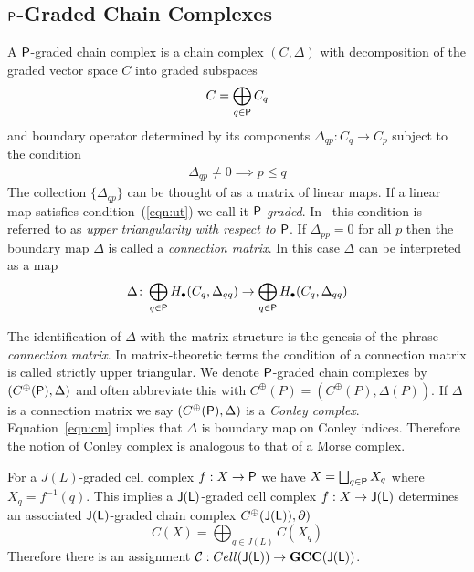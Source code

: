 %
%


\subsection{${\mathsf P}$-Graded Chain Complexes}\label{sec:grad:chain}


A ${\mathsf P}$-graded chain complex is a chain complex $(C,\Delta)$ with decomposition of the graded vector space $C$ into graded subspaces $$C=\bigoplus_{q\in {\mathsf P}} C_q$$ and boundary operator determined by its components $\Delta_{qp}:C_q\to C_p$ subject to the condition 
\begin{align}\label{eqn:ut}
\Delta_{qp}\neq 0\implies p\leq q
\end{align}  The collection $\{\Delta_{qp}\}$ can be thought of as a matrix of linear maps. If a linear map satisfies condition~(\ref{eqn:ut}) we call it {\em ${\mathsf P}$-graded}.  In~\cite{fran} this condition is referred to as {\em upper triangularity with respect to ${\mathsf P}$}.   If $\Delta_{pp} = 0$ for all $p$ then the boundary map $\Delta$ is called a {\em connection matrix}.  In this case $\Delta$ can be interpreted as a map
\begin{align}\label{eqn:cm}
\Delta \colon \bigoplus_{q\in {\mathsf P}} H_\bullet(C_q,\Delta_{qq})\to \bigoplus_{q\in {\mathsf P}} H_\bullet(C_q,\Delta_{qq})
\end{align}

The identification of $\Delta$ with the matrix structure is the genesis of the phrase {\em connection matrix}.  In matrix-theoretic terms the condition of a connection matrix is called strictly upper triangular.  We denote ${\mathsf P}$-graded chain complexes by $(C^\oplus({\mathsf P}),\Delta)$ and often abbreviate this with $C^\oplus(P)=(C^\oplus(P),\Delta(P))$.  If  $\Delta$ is a connection matrix we say $(C^\oplus({\mathsf P}),\Delta)$ is a {\em Conley complex}.  Equation~\ref{eqn:cm} implies that $\Delta$ is boundary map on Conley indices.  Therefore the notion of Conley complex is analogous to that of a Morse complex.


\begin{ex}
For a $J(L)$-graded cell complex $f:X\to {\mathsf P}$ we have $X=\bigsqcup_{q\in {\mathsf P}} X_q$ where $X_q=f^{-1}(q)$.   This implies a ${\mathsf J}({\mathsf L})$-graded cell complex $f:X\to {\mathsf J}({\mathsf L})$ determines an associated ${\mathsf J}({\mathsf L})$-graded chain complex $C^\oplus({\mathsf J}({\mathsf L})),\partial)$ 
\[
C(X) = \bigoplus_{q\in J(L)} C(X_q)
\]
Therefore there is an assignment ${\mathcal C}:Cell({\mathsf J}({\mathsf L}))\to {\bf GCC}({\mathsf J}({\mathsf L}))$. 
\end{ex}

